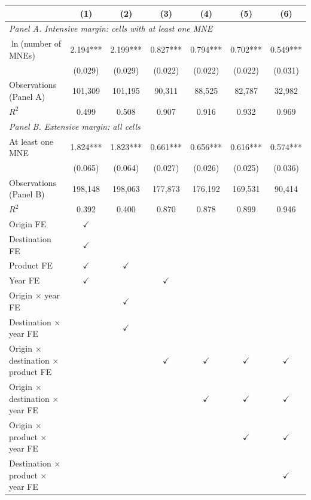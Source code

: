 \begin{tabular}{l*{6}{c}}
\toprule
 & (1) & (2) & (3) & (4) & (5) & (6) \\
\midrule
\multicolumn{7}{l}{\textit{Panel A. Intensive margin: cells with at least one MNE}} \\
$\ln$(number of MNEs) & 2.194*** & 2.199*** & 0.827*** & 0.794*** & 0.702*** & 0.549*** \\
 & (0.029) & (0.029) & (0.022) & (0.022) & (0.022) & (0.031) \\
Observations (Panel A) & 101,309 & 101,195 & 90,311 & 88,525 & 82,787 & 32,982 \\
$R^2$ & 0.499 & 0.508 & 0.907 & 0.916 & 0.932 & 0.969 \\
\midrule
\multicolumn{7}{l}{\textit{Panel B. Extensive margin: all cells}} \\
At least one MNE & 1.824*** & 1.823*** & 0.661*** & 0.656*** & 0.616*** & 0.574*** \\
 & (0.065) & (0.064) & (0.027) & (0.026) & (0.025) & (0.036) \\
Observations (Panel B) & 198,148 & 198,063 & 177,873 & 176,192 & 169,531 & 90,414 \\
$R^2$ & 0.392 & 0.400 & 0.870 & 0.878 & 0.899 & 0.946 \\
\midrule
Origin FE & $\checkmark$ &  &  &  &  &  \\
Destination FE & $\checkmark$ &  &  &  &  &  \\
Product FE & $\checkmark$ & $\checkmark$ &  &  &  &  \\
Year FE & $\checkmark$ &  & $\checkmark$ &  &  &  \\
Origin $\times$ year FE &  & $\checkmark$ &  &  &  &  \\
Destination $\times$ year FE &  & $\checkmark$ &  &  &  &  \\
Origin $\times$ destination $\times$ product FE &  &  & $\checkmark$ & $\checkmark$ & $\checkmark$ & $\checkmark$ \\
Origin $\times$ destination $\times$ year FE &  &  &  & $\checkmark$ & $\checkmark$ & $\checkmark$ \\
Origin $\times$ product $\times$ year FE &  &  &  &  & $\checkmark$ & $\checkmark$ \\
Destination $\times$ product $\times$ year FE &  &  &  &  &  & $\checkmark$ \\
\bottomrule
\end{tabular}
